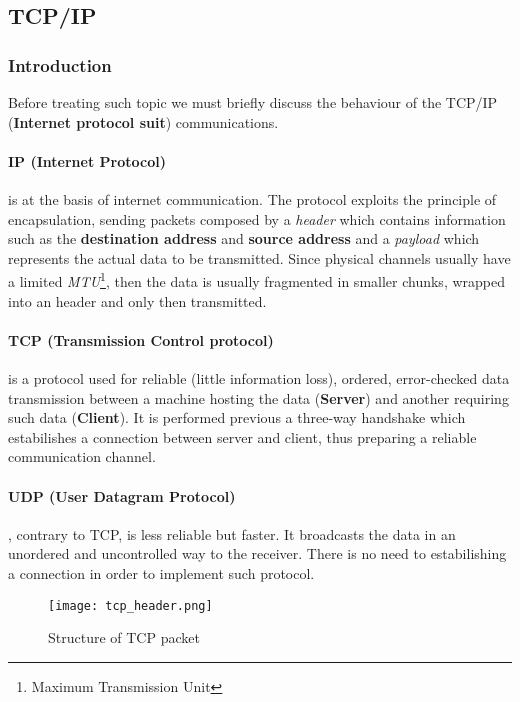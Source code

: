 \documentclass[../../main.tex]{subfiles}
\begin{document}
    \subsection{TCP/IP}
    \subsubsection{Introduction}
    Before treating such topic we must briefly discuss the behaviour of the
    TCP/IP (\textbf{Internet protocol suit}) communications.
    
    \paragraph{IP (Internet Protocol)} is at the basis of internet
    communication. The protocol exploits the principle of encapsulation, sending
    packets composed by a \emph{header} which contains information such as the
    \textbf{destination address} and \textbf{source address} and a
    \emph{payload} which represents the actual data to be transmitted.
    Since physical channels usually have a limited \emph{MTU}\footnote{Maximum
    Transmission Unit}, then the data is usually fragmented in smaller chunks,
    wrapped into an header and only then transmitted.
    
    \paragraph{TCP (Transmission Control protocol)} is a protocol used for
    reliable (little information loss), ordered, error-checked data transmission
    between a machine hosting the data (\textbf{Server}) and another requiring
    such data (\textbf{Client}). It is performed previous a three-way handshake
    which estabilishes a connection between server and client, thus preparing a
    reliable communication channel.

    \paragraph{UDP (User Datagram Protocol)}, contrary to TCP, is less reliable
    but faster.
    It broadcasts the data in an unordered and uncontrolled way to the receiver. 
    There is no need to estabilishing a connection in order to implement such
    protocol.

    \begin{figure}[h]
        \centering
        \caption{Structure of TCP packet}
        \texttt{[image: tcp\_header.png]}
    \end{figure}
\end{document}
